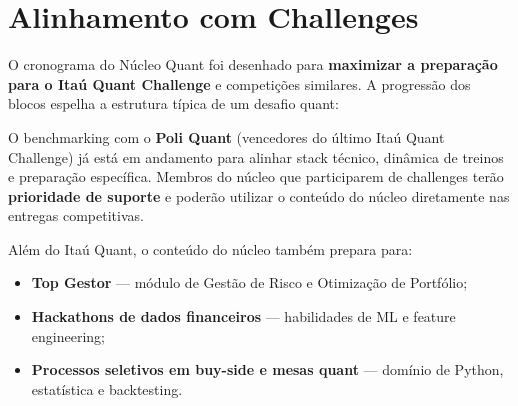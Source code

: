 \documentclass[12pt,a4paper]{article}
\begin{document}
\section{Alinhamento com Challenges}

O cronograma do Núcleo Quant foi desenhado para \textbf{maximizar a preparação para o Itaú Quant Challenge} e competições similares. A progressão dos blocos espelha a estrutura típica de um desafio quant:

\begin{center}
\end{center}

\vspace{0.3cm}

O benchmarking com o \textbf{Poli Quant} (vencedores do último Itaú Quant Challenge) já está em andamento para alinhar stack técnico, dinâmica de treinos e preparação específica. Membros do núcleo que participarem de challenges terão \textbf{prioridade de suporte} e poderão utilizar o conteúdo do núcleo diretamente nas entregas competitivas.

Além do Itaú Quant, o conteúdo do núcleo também prepara para:
\begin{itemize}[leftmargin=*]
    \item \textbf{Top Gestor} — módulo de Gestão de Risco e Otimização de Portfólio;
    \item \textbf{Hackathons de dados financeiros} — habilidades de ML e feature engineering;
    \item \textbf{Processos seletivos em buy-side e mesas quant} — domínio de Python, estatística e backtesting.
\end{itemize}
\end{document}
